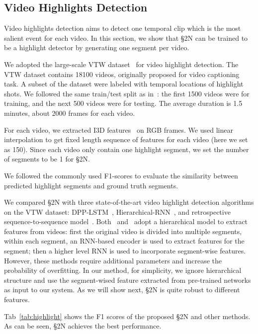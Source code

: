 \documentclass[10pt,journal,compsoc]{IEEEtran}
\begin{document}
\subsection{Video Highlights Detection~\label{sec:video-highlight}}
Video highlights detection aims to detect one temporal clip which is the most salient event for each video. In this section, we show that \S2N can be trained to be a highlight detector by generating one segment per video.

 We adopted the large-scale VTW dataset~\cite{zeng2016generation} for video highlight detection. The VTW dataset contains 18100 videos, originally proposed for video captioning task. A subset of the dataset were labeled with temporal locations of highlight shots. We followed the same train/test split as in~\cite{zhang2018retrospective}: the first 1500 videos were for training, and the next 500 videos were for testing. The average duration is 1.5 minutes, about 2000 frames for each video.

For each video, we extracted I3D features~\cite{carreira2017quo} on RGB frames. We used linear interpolation to get fixed length sequence of features for each video (here we set as 150). Since each video only contain one highlight segment, we set the number of segments to be 1 for \S2N.

 We followed the commonly used F1-scores to evaluate the similarity between predicted highlight segments and ground truth segments. 

 We compared \S2N with three state-of-the-art video highlight detection algorithms on the VTW dataset: DPP-LSTM~\cite{zhang2016video}, Hierarchical-RNN~\cite{zhao2017hierarchical}, and retrospective sequence-to-sequence model~\cite{zhang2018retrospective}. Both~\cite{zhao2017hierarchical} and~\cite{zhang2018retrospective} adopt a hierarchical model to extract features from videos: first the original video is divided into multiple segments, within each segment, an RNN-based encoder is used to extract features for the segment; then a higher level RNN is used to incorporate segment-wise features. However, these methods require additional parameters and increase the probability of overfitting. In our method, for simplicity, we ignore hierarchical structure and use the segment-wised feature extracted from pre-trained networks as input to our system. As we will show next, \S2N is quite robust to different features.

 Tab~\ref{tab:highlight} shows the F1 scores of the proposed \S2N and other methods. As can be seen, \S2N achieves the best performance. 
\end{document}
